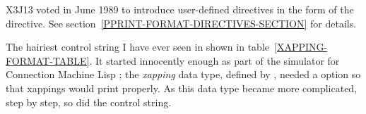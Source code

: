 \begin{new}
X3J13 voted in June 1989 
to introduce user-defined directives in the form of the
 directive.
See section~\ref{PPRINT-FORMAT-DIRECTIVES-SECTION} for details.
\end{new}

\begin{new}
The hairiest  control string I have ever seen in shown
in table~\ref{XAPPING-FORMAT-TABLE}.
It started innocently enough as part of the simulator for Connection Machine Lisp
\cite{CONNECTION-MACHINE-LISP,CMLISP-IMPLEMENTATION}; the {\it xapping} data type,
defined by , needed a  option so that
xappings would print properly.  As this data type became more complicated, step by step,
so did the  control string.
\end{new}
